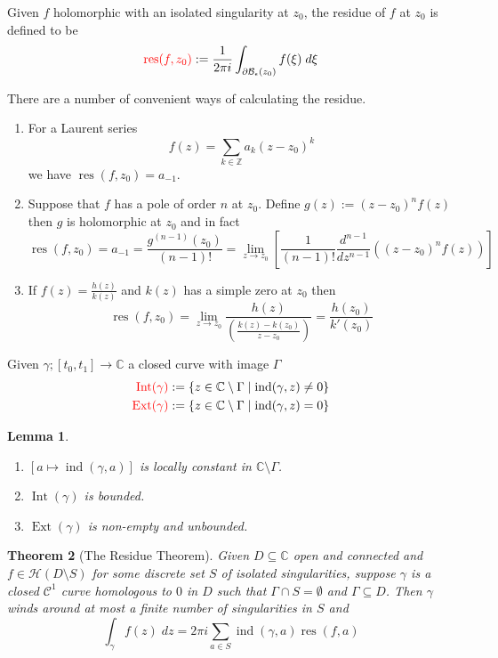 \documentclass[11pt]{article}
\newcommand{\defeq}{:=}
\DeclareMathOperator{\ind}{\text{ind}}
\DeclareMathOperator{\res}{\text{res}}
\DeclareMathOperator{\Int}{\text{Int}}
\DeclareMathOperator{\Ext}{\text{Ext}}
\newcommand{\relmiddle}[1]{\mathrel{}\middle#1\mathrel{}}
\newcommand{\rmv}{\relmiddle|}
\newcommand{\C}{\mathbb{C}}
\newcommand{\Z}{\mathbb{Z}}
\newenvironment{defin}
	{\begin{mdframed}[backgroundcolor=white, roundcorner=5pt, linewidth=1pt]}
	{\end{mdframed}}
\newcommand{\mdf}[1]{{\color{red} #1}}
\newtheorem{theorem}{Theorem}[section]
\newtheorem{lemma}[theorem]{Lemma}
\begin{document}
\begin{defin}
	Given $f$ holomorphic with an isolated singularity at $z_0$, the \mdf{residue of $f$ at $z_0$} is defined to be
	\[
		\mdf{\res(f,z_0)}\defeq\frac{1}{2\pi i}\int_{\partial \mathcal{B}_\epsilon(z_0)}f(\xi)\;d\xi
	\]
\end{defin}

There are a number of convenient ways of calculating the residue.
\begin{enumerate}
	\item For a Laurent series
	\[
		f(z)=\sum_{k\in\Z}a_k(z-z_0)^k
	\]
	we have $\res(f, z_0)=a_{-1}$.
\item Suppose that $f$ has a pole of order $n$ at $z_0$.
	Define $g(z)\defeq(z-z_0)^nf(z)$ then $g$ is holomorphic at $z_0$ and in fact
	\[
		\res(f,z_0)=a_{-1}=\frac{g^{(n-1)}(z_0)}{(n-1)!}=\lim_{z\to z_0}\left[\frac{1}{(n-1)!}\frac{d^{n-1}}{dz^{n-1}}\left((z-z_0)^nf(z)\right)\right]
	\]
\item If $f(z)=\frac{h(z)}{k(z)}$ and $k(z)$ has a simple zero at $z_0$ then
	\[
		\res(f,z_0)=\lim_{z\to z_0} \frac{h(z)}{\left(\frac{k(z)-k(z_0)}{z-z_0}\right)}=\frac{h(z_0)}{k'(z_0)}
	\]
\end{enumerate}

\begin{defin}
	Given $\gamma;[t_0, t_1]\to\C$ a closed curve with image $\Gamma$
	\begin{align*}
		\mdf{\Int(\gamma)}&\defeq\left\{z\in\C\setminus\Gamma \rmv \ind(\gamma, z)\neq 0\right\} \\
		\mdf{\Ext(\gamma)}&\defeq\left\{z\in\C\setminus\Gamma \rmv \ind(\gamma, z) = 0\right\}
	\end{align*}
\end{defin}

\begin{lemma}
\begin{enumerate}[label=(\alph*)]
	\item $\left[a\mapsto\ind(\gamma, a)\right]$ is locally constant in $\C\setminus\Gamma$.
	\item $\Int(\gamma)$ is bounded.
	\item $\Ext(\gamma)$ is non-empty and unbounded.
\end{enumerate}
\end{lemma}

\begin{theorem}[The Residue Theorem]
Given $D\subseteq\C$ open and connected and $f\in\mathcal{H}(D\setminus S)$ for some discrete set $S$ of isolated singularities, suppose $\gamma$ is a closed $\mathcal{C}^1$ curve homologous to $0$ in $D$ such that $\Gamma\cap S = \emptyset$ and $\Gamma\subseteq D$.
Then $\gamma$ winds around at most a finite number of singularities in $S$ and
\[
	\int_\gamma f(z)\;dz = 2\pi i \sum_{a\in S}\ind(\gamma, a)\res(f, a)
\]
\end{theorem}
\end{document}
